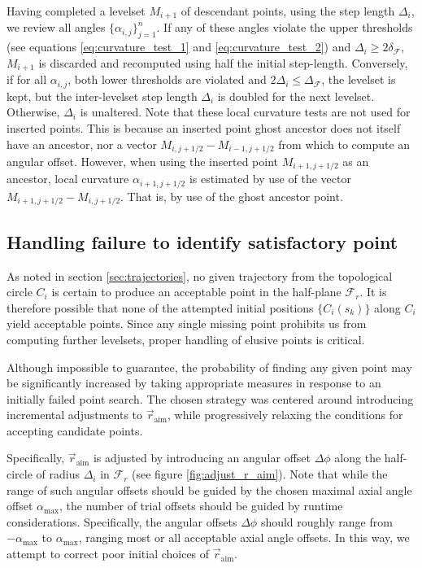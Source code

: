 Having completed a levelset $M_{i+1}$ of descendant points, using the step length $\Delta_i$, we review all angles $\{\alpha_{i,j}\}_{j=1}^n$. If any of these angles violate the upper thresholds (see equations \eqref{eq:curvature_test_1} and \eqref{eq:curvature_test_2}) and $\Delta_i\geq 2\delta_{\mathcal{F}}$, $M_{i+1}$ is discarded and recomputed using half the initial step-length. Conversely, if for all $\alpha_{i,j}$, both lower thresholds are violated and $2\Delta_i\leq \Delta_{\mathcal{F}}$, the levelset is kept, but the inter-levelset step length $\Delta_i$ is doubled for the next levelset. Otherwise, $\Delta_i$ is unaltered. Note that these local curvature tests are not used for inserted points. This is because an inserted point ghost ancestor does not itself have an ancestor, nor a vector $M_{i,j+1/2}-M_{i-1,j+1/2}$ from which to compute an angular offset. However, when using the inserted point $M_{i+1,j+1/2}$ as an ancestor, local curvature $\alpha_{i+1,j+1/2}$ is estimated by use of the vector $M_{i+1,j+1/2}-M_{i,j+1/2}$. That is, by use of the ghost ancestor point.

\subsection{Handling failure to identify satisfactory point}\label{sec:failure_management}

As noted in section \ref{sec:trajectories}, no given trajectory from the topological circle $C_i$ is certain to produce an acceptable point in the half-plane $\mathcal{F}_r$. It is therefore possible that none of the attempted initial positions $\{C_i(s_k)\}$ along $C_i$ yield acceptable points. Since any single missing point prohibits us from computing further levelsets, proper handling of elusive points is critical.

Although impossible to guarantee, the probability of finding any given point may be significantly increased by taking appropriate measures in response to an initially failed point search. The chosen strategy was centered around introducing incremental adjustments to $\vec{r}_{\text{aim}}$, while progressively relaxing the conditions for accepting candidate points. 

Specifically, $\vec{r}_{\text{aim}}$ is adjusted by introducing an angular offset $\Delta\phi$ along the half-circle of radius $\Delta_i$ in $\mathcal{F}_r$ (see figure \ref{fig:adjust_r_aim}). Note that while the range of such angular offsets should be guided by the chosen maximal axial angle offset $\alpha_{\text{max}}$, the number of trial offsets should be guided by runtime considerations. Specifically, the angular offsets $\Delta \phi$ should roughly range from $-\alpha_{\text{max}}$ to $\alpha_{\text{max}}$, ranging most or all acceptable axial angle offsets. In this way, we attempt to correct poor initial choices of $\vec{r}_{\text{aim}}$.

